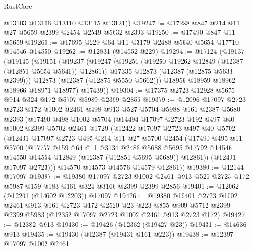 \begin{lexlean}{RustCore}
\begin{coremodule}
        @13103
        @13106
        @13110
        @13115
        @13121))
@19247 := @17288 @847 @214 @11 @27 @5659 @2399 @2454 @2549 @5632 @2393
@19250 := @17490 @847 @11 @5659
@19260 := @17695 @229 @64 @11 @3179 @2488 @5640 @5654 @17710 @14546 @14550
@19262 := @12831 (@14552 @229)
@19294 := @17124
    (@19137
      (@19145
        (@19151
          (@19237
            (@19247
              (@19250 (@19260 @19262 @12849 (@12387 (@12851 @5654 @5641)) @12861))
              @17335
              @12873
              (@12387 (@12875 @5633 @2399)))
            @12873
            (@12387 (@12875 @5550 @5662)))
          @18956
          @18959
          @18962
          @18966
          @18971
          @18977)
        @17439))
@19304 := @17375 @2723 @12928 @5675 @914 @324 @172 @5707 @5989 @2399 @2856
@19379 := @12096
    @17097
    @2723
    @2723
    @172
    @1002
    @2461
    @498
    @913
    @527
    @5704
    @5988
    @161
    @2387
    @5680
    @2393
    (@17490
      @498
      @1002
      @5704
      (@14494
        @17097
        @2723
        @192
        @497
        @40
        @1002
        @2399
        @5702
        @2461
        @1729
        (@12422
          @17097
          @2723
          @497
          @40
          @5702
          (@12431
            @17097
            @2723
            @495
            @214
            @11
            @27
            @5700
            @2454
            (@17490
              @495
              @11
              @5700
              (@17777
                @159
                @64
                @11
                @3134
                @2488
                @5688
                @5695
                @17792
                @14546
                @14550
                @14554
                @12849
                (@12387 (@12851 @5695 @5689))
                @12861))
            (@12491 @17097 @2723)))
        @14570
        @14573
        @14576
        @14579
        @12861))
@19380 := @12144 @17097
@19397 := @19380
    @17097
    @2723
    @1002
    @2461
    @913
    @526
    @2723
    @172
    @5987
    @159
    @183
    @161
    @324
    @3166
    @2399
    @2399
    @2856
@19401 := @12062 (@12201 (@14602 @12203)) @17097
@19426 := @19380
    @19401
    @2723
    @1002
    @2461
    @913
    @161
    @2723
    @172
    @2520
    @23
    @223
    @855
    @909
    @5712
    @2399
    @2399
    @5983
    (@12352 @17097 @2723 @1002 @2461 @913 @2723 @172)
@19427 := @12382 @913
@19430 := @19426 (@12362 (@19427 @23))
@19431 := @14636 @913
@19435 := @19430 (@12387 (@19431 @161 @223))
@19438 := @12397 @17097 @1002 @2461

\end{coremodule}
\end{lexlean}
